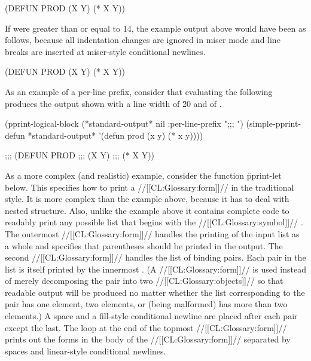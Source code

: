 \code
(DEFUN PROD
       (X Y)
  (* X Y))
\endcode
 
If  were greater than or equal to 14, the example 
output above would have been as follows, because all indentation changes 
are ignored in miser mode and line breaks are inserted at 
miser-style conditional newlines.
 
\code
 (DEFUN
  PROD
  (X Y)
  (* X Y))
\endcode 

As an example of a per-line prefix, consider that evaluating the following
produces the output shown with a line width of \f{20} and
 of \nil.
 
\code
 (pprint-logical-block (*standard-output* nil :per-line-prefix ";;; ")
   (simple-pprint-defun *standard-output* '(defun prod (x y) (* x y))))
 
 ;;; (DEFUN PROD
 ;;;        (X Y)
 ;;;   (* X Y))
\endcode
 
As a more complex (and realistic) example, consider the function \f{pprint-let}
below.  This specifies how to print a  //[[CL:Glossary:form]]// in the traditional
style.  It is more complex than the example above, because it has to deal with
nested structure.  Also, unlike the example above it contains complete code to 
readably print any possible list that begins with the //[[CL:Glossary:symbol]]// .
The outermost  //[[CL:Glossary:form]]// handles the printing of
the input list as a whole and specifies that parentheses should be printed in the
output.  The second  //[[CL:Glossary:form]]// handles the list 
of binding pairs.  Each pair in the list is itself printed by the innermost
.  (A  //[[CL:Glossary:form]]// is used instead of
merely decomposing the pair into two //[[CL:Glossary:objects]]// so that readable output will
be produced no matter whether the list corresponding to the pair has one element,
two elements, or (being malformed) has more than two elements.)   
A space and a 
fill-style conditional newline
are placed after
each pair except the last.  The loop at the end of the topmost
 //[[CL:Glossary:form]]// prints out the forms in the body
of the  //[[CL:Glossary:form]]// separated by spaces and 
linear-style conditional newlines.
 
